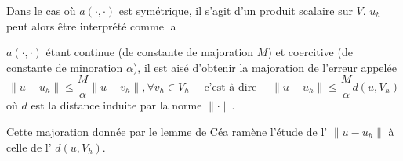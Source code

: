 Dans le cas où $a(\cdot,\cdot)$ est symétrique, il s'agit d'un produit scalaire sur $V$.
$u_h$ peut alors être interprété comme la 


\medskip
\begin{lemme}
$a(\cdot,\cdot)$ étant continue (de constante de majoration $M$) et coercitive
(de constante de minoration $\alpha$), il est aisé d'obtenir la majoration
de l'erreur appelée 
\begin{equation}
\|u-u_h\|\le\dfrac{M}{\alpha}\|u-v_h\|, \forall v_h\in V_h
\quad \text{ c'est-à-dire } \quad
\|u-u_h\|\le\dfrac{M}{\alpha}d(u,V_h)
\end{equation}
où $d$ est la distance induite par la norme $\|\cdot\|$.
\end{lemme}

Cette majoration donnée par le lemme de Céa ramène l'étude de l' $\|u-u_h\|$ à celle de l' $d(u,V_h)$.



\medskip

